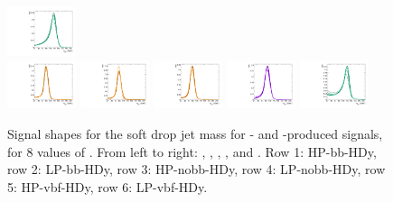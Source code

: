 \begin{figure}[htbp]
  \includegraphics[width=0.18\textwidth]{fig/analysis/templateSignalVsMX_fromDC_WprToWH_MJJ_mu_HP_vbf_DEtaHi.pdf}\\
  \includegraphics[width=0.18\textwidth]{fig/analysis/templateSignalVsMX_fromDC_GbuToWW_MJJ_mu_LP_vbf_DEtaHi.pdf}
  \includegraphics[width=0.18\textwidth]{fig/analysis/templateSignalVsMX_fromDC_RadToWW_MJJ_mu_LP_vbf_DEtaHi.pdf}
  \includegraphics[width=0.18\textwidth]{fig/analysis/templateSignalVsMX_fromDC_ZprToWW_MJJ_mu_LP_vbf_DEtaHi.pdf}
  \includegraphics[width=0.18\textwidth]{fig/analysis/templateSignalVsMX_fromDC_WprToWZ_MJJ_mu_LP_vbf_DEtaHi.pdf}
  \includegraphics[width=0.18\textwidth]{fig/analysis/templateSignalVsMX_fromDC_WprToWH_MJJ_mu_LP_vbf_DEtaHi.pdf}\\
  \caption{
    Signal shapes for the soft drop jet mass \MJ for \ggF- and \DY-produced signals, for 8 values of \MX.
    From left to right: \GBulktoWW, \RadtoWW, \ZprtoWW, \WprtoWZ, and \WprtoWH.
    Row 1: HP-bb-HDy, row 2: LP-bb-HDy, row 3: HP-nobb-HDy, row 4: LP-nobb-HDy, row 5: HP-vbf-HDy, row 6: LP-vbf-HDy.
  }
  \label{fig:MJJShapes_NonVBF_HDy_Run2}
\end{figure}

